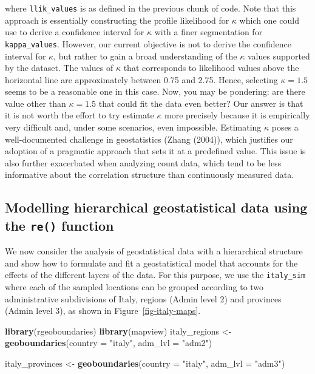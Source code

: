 \documentclass[
  letterpaper,
]{krantz}
\newenvironment{Shaded}{\begin{snugshade}}{\end{snugshade}}
\newcommand{\AttributeTok}[1]{\textcolor[rgb]{0.13,0.29,0.53}{#1}}
\newcommand{\FunctionTok}[1]{\textcolor[rgb]{0.13,0.29,0.53}{\textbf{#1}}}
\newcommand{\NormalTok}[1]{#1}
\newcommand{\OtherTok}[1]{\textcolor[rgb]{0.56,0.35,0.01}{#1}}
\newcommand{\StringTok}[1]{\textcolor[rgb]{0.31,0.60,0.02}{#1}}
\begin{document}
where \texttt{llik\_values} is as defined in the previous chunk of code.
Note that this approach is essentially constructing the profile
likelihood for \(\kappa\) which one could use to derive a confidence
interval for \(\kappa\) with a finer segmentation for
\texttt{kappa\_values}. However, our current objective is not to derive
the confidence interval for \(\kappa\), but rather to gain a broad
understanding of the \(\kappa\) values supported by the dataset. The
values of \(\kappa\) that corresponds to likelihood values above the
horizontal line are approximately between 0.75 and 2.75. Hence,
selecting \(\kappa=1.5\) seems to be a reasonable one in this case. Now,
you may be pondering: are there value other than \(\kappa=1.5\) that
could fit the data even better? Our answer is that it is not worth the
effort to try estimate \(\kappa\) more precisely because it is
empirically very difficult and, under some scenarios, even impossible.
Estimating \(\kappa\) poses a well-documented challenge in geostatistics
(Zhang (2004)), which justifies our adoption of a pragmatic approach
that sets it at a predefined value. This issue is also further
exacerbated when analyzing count data, which tend to be less informative
about the correlation structure than continuously measured data.

\subsection{\texorpdfstring{Modelling hierarchical geostatistical data
using the \texttt{re()}
function}{Modelling hierarchical geostatistical data using the re() function}}\label{sec-add-re-glgm}

We now consider the analysis of geostatistical data with a hierarchical
structure and show how to formulate and fit a geostatistical model that
accounts for the effects of the different layers of the data. For this
purpose, we use the \texttt{italy\_sim} where each of the sampled
locations can be grouped according to two administrative subdivisions of
Italy, regions (Admin level 2) and provinces (Admin level 3), as shown
in Figure~\ref{fig-italy-maps}.

\begin{Shaded}
\begin{Highlighting}[]
\FunctionTok{library}\NormalTok{(rgeoboundaries)}
\FunctionTok{library}\NormalTok{(mapview)}
\NormalTok{italy\_regions }\OtherTok{\textless{}{-}} \FunctionTok{geoboundaries}\NormalTok{(}\AttributeTok{country =} \StringTok{"italy"}\NormalTok{, }\AttributeTok{adm\_lvl =} \StringTok{"adm2"}\NormalTok{)}

\NormalTok{italy\_provinces }\OtherTok{\textless{}{-}} \FunctionTok{geoboundaries}\NormalTok{(}\AttributeTok{country =} \StringTok{"italy"}\NormalTok{, }\AttributeTok{adm\_lvl =} \StringTok{"adm3"}\NormalTok{)}
\end{Highlighting}
\end{Shaded}
\end{document}
